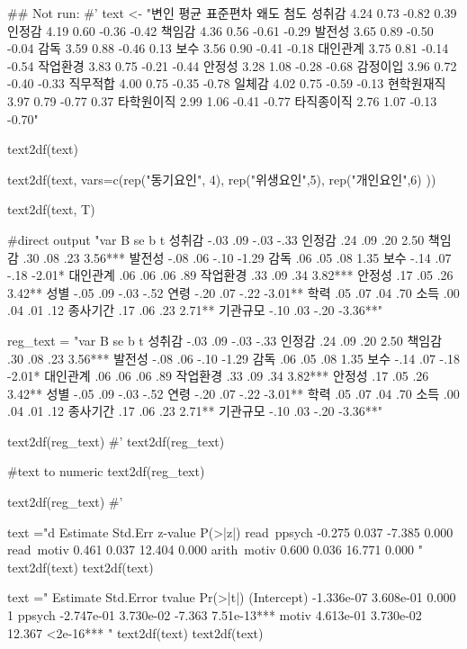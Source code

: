 \documentclass[a4paper]{book}
\begin{document}
\begin{Examples}
\begin{ExampleCode}

\#\# Not run: 
#'
text <- "변인 평균 표준편차 왜도 첨도
성취감 4.24 0.73 -0.82 0.39
인정감 4.19 0.60 -0.36 -0.42
책임감 4.36 0.56 -0.61 -0.29
발전성 3.65 0.89 -0.50 -0.04
감독 3.59 0.88 -0.46 0.13
보수 3.56 0.90 -0.41 -0.18
대인관계 3.75 0.81 -0.14 -0.54
작업환경 3.83 0.75 -0.21 -0.44
안정성 3.28 1.08 -0.28 -0.68
감정이입 3.96 0.72 -0.40 -0.33
직무적합 4.00 0.75 -0.35 -0.78
일체감 4.02 0.75 -0.59 -0.13
현학원재직 3.97 0.79 -0.77 0.37
타학원이직 2.99 1.06 -0.41 -0.77
타직종이직 2.76 1.07 -0.13 -0.70"

text2df(text)

text2df(text, vars=c(rep("동기요인", 4), rep("위생요인",5), rep("개인요인",6)  ))

text2df(text, T)%

#direct output
"var B se b t
성취감 -.03 .09 -.03 -.33
인정감 .24 .09 .20 2.50
책임감 .30 .08 .23 3.56***
발전성 -.08 .06 -.10 -1.29
감독 .06 .05 .08 1.35
보수 -.14 .07 -.18 -2.01*
대인관계 .06 .06 .06 .89
작업환경 .33 .09 .34 3.82***
안정성 .17 .05 .26 3.42**
성별 -.05 .09 -.03 -.52
연령 -.20 .07 -.22 -3.01**
학력 .05 .07 .04 .70
소득 .00 .04 .01 .12
종사기간 .17 .06 .23 2.71**
기관규모 -.10 .03 -.20 -3.36**" %

reg_text = "var B se b t
성취감 -.03 .09 -.03 -.33
인정감 .24 .09 .20 2.50
책임감 .30 .08 .23 3.56***
발전성 -.08 .06 -.10 -1.29
감독 .06 .05 .08 1.35
보수 -.14 .07 -.18 -2.01*
대인관계 .06 .06 .06 .89
작업환경 .33 .09 .34 3.82***
안정성 .17 .05 .26 3.42**
성별 -.05 .09 -.03 -.52
연령 -.20 .07 -.22 -3.01**
학력 .05 .07 .04 .70
소득 .00 .04 .01 .12
종사기간 .17 .06 .23 2.71**
기관규모 -.10 .03 -.20 -3.36**"

text2df(reg_text)
#'
text2df(reg_text) %

#text to numeric
text2df(reg_text)%

text2df(reg_text)%
#'

text ="d           Estimate  Std.Err  z-value  P(>|z|)
  read~ppsych           -0.275    0.037   -7.385    0.000
    read~motiv             0.461    0.037   12.404    0.000
arith~motiv             0.600    0.036   16.771    0.000
"
text2df(text)
text2df(text) %

text ="             Estimate Std.Error tvalue Pr(>|t|)
(Intercept) -1.336e-07  3.608e-01   0.000        1
ppsych      -2.747e-01  3.730e-02  -7.363  7.51e-13***
motiv        4.613e-01  3.730e-02  12.367  <2e-16***
"
text2df(text) %
text2df(text) %



\end{ExampleCode}
\end{Examples}
\end{document}
